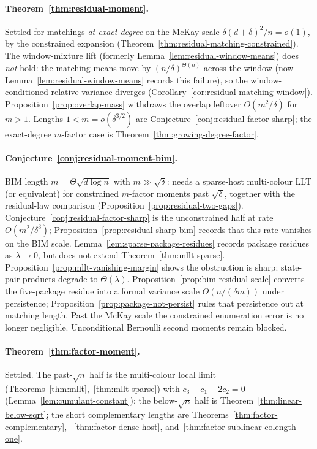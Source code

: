 \documentclass[11pt]{article}
\begin{document}
\paragraph{Theorem~\ref{thm:residual-moment}.}
Settled for matchings \emph{at exact degree} on the McKay scale
\(\delta(d+\delta)^2/n=o(1)\), by the constrained expansion
(Theorem~\ref{thm:residual-matching-constrained}).
The window-mixture lift (formerly Lemma~\ref{lem:residual-window-means}) does \emph{not}
hold: the matching means move by \((n/\delta)^{\Theta(n)}\) across the window
(now Lemma~\ref{lem:residual-window-means} records this failure), so the window-conditioned
relative variance diverges (Corollary~\ref{cor:residual-matching-window}).
Proposition~\ref{prop:overlap-mass} withdraws the overlap leftover
\(O(m^2/\delta)\) for \(m>1\). Lengths \(1<m=o(\delta^{3/2})\) are
Conjecture~\ref{conj:residual-factor-sharp}; the exact-degree \(m\)-factor case is
Theorem~\ref{thm:growing-degree-factor}.

\paragraph{Conjecture~\ref{conj:residual-moment-bim}.}
BIM length \(m=\Theta\sqrt{d\log n}\) with \(m\gg\sqrt\delta\): needs a
sparse-host multi-colour LLT (or equivalent) for constrained \(m\)-factor
moments past \(\sqrt\delta\), together with the residual-law comparison
(Proposition~\ref{prop:residual-two-gaps}).
Conjecture~\ref{conj:residual-factor-sharp} is the unconstrained half at rate
\(O(m^2/\delta^3)\); Proposition~\ref{prop:residual-sharp-bim} records that
this rate vanishes on the BIM scale. Lemma~\ref{lem:sparse-package-residues}
records package residues as \(\lambda\to0\), but does not extend
Theorem~\ref{thm:mllt-sparse}. Proposition~\ref{prop:mllt-vanishing-margin}
shows the obstruction is sharp: state-pair products degrade to
\(\Theta(\lambda)\). Proposition~\ref{prop:bim-residual-scale} converts the
five-package residue into a formal variance scale \(\Theta(n/(\delta m))\)
under persistence; Proposition~\ref{prop:package-not-persist} rules that
persistence out at matching length. Past the McKay scale the constrained
enumeration error is no longer negligible. Unconditional Bernoulli second
moments remain blocked.

\paragraph{Theorem~\ref{thm:factor-moment}.}
Settled. The past-\(\sqrt{n}\) half is the multi-colour local limit
(Theorems~\ref{thm:mllt},~\ref{thm:mllt-sparse}) with
\(c_3+c_1-2c_2=0\) (Lemma~\ref{lem:cumulant-constant}); the
below-\(\sqrt{n}\) half is Theorem~\ref{thm:linear-below-sqrt}; the short
complementary lengths are Theorems~\ref{thm:factor-complementary},
~\ref{thm:factor-dense-host}, and~\ref{thm:factor-sublinear-colength-one}.
\end{document}
